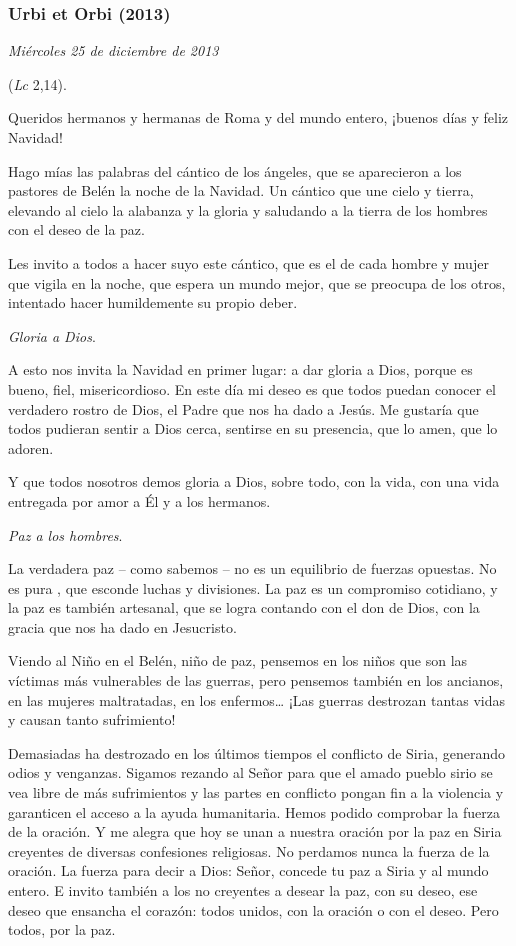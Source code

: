 \subsubsection{Urbi et Orbi (2013)} \emph{Miércoles 25 de diciembre de 2013}


\emph{} (\emph{Lc} 2,14).

Queridos hermanos y hermanas de Roma y del mundo entero, ¡buenos días y feliz Navidad!

Hago mías las palabras del cántico de los ángeles, que se aparecieron a los pastores de Belén la noche de la Navidad. Un cántico que une cielo y tierra, elevando al cielo la alabanza y la gloria y saludando a la tierra de los hombres con el deseo de la paz.

Les invito a todos a hacer suyo este cántico, que es el de cada hombre y mujer que vigila en la noche, que espera un mundo mejor, que se preocupa de los otros, intentado hacer humildemente su propio deber.

\emph{Gloria a Dios}.

A esto nos invita la Navidad en primer lugar: a dar gloria a Dios, porque es bueno, fiel, misericordioso. En este día mi deseo es que todos puedan conocer el verdadero rostro de Dios, el Padre que nos ha dado a Jesús. Me gustaría que todos pudieran sentir a Dios cerca, sentirse en su presencia, que lo amen, que lo adoren.

Y que todos nosotros demos gloria a Dios, sobre todo, con la vida, con una vida entregada por amor a Él y a los hermanos.

\emph{Paz a los hombres}.

La verdadera paz -- como sabemos -- no es un equilibrio de fuerzas opuestas. No es pura , que esconde luchas y divisiones. La paz es un compromiso cotidiano, y la paz es también artesanal, que se logra contando con el don de Dios, con la gracia que nos ha dado en Jesucristo.

Viendo al Niño en el Belén, niño de paz, pensemos en los niños que son las víctimas más vulnerables de las guerras, pero pensemos también en los ancianos, en las mujeres maltratadas, en los enfermos\ldots{} ¡Las guerras destrozan tantas vidas y causan tanto sufrimiento!

Demasiadas ha destrozado en los últimos tiempos el conflicto de Siria, generando odios y venganzas. Sigamos rezando al Señor para que el amado pueblo sirio se vea libre de más sufrimientos y las partes en conflicto pongan fin a la violencia y garanticen el acceso a la ayuda humanitaria. Hemos podido comprobar la fuerza de la oración. Y me alegra que hoy se unan a nuestra oración por la paz en Siria creyentes de diversas confesiones religiosas. No perdamos nunca la fuerza de la oración. La fuerza para decir a Dios: Señor, concede tu paz a Siria y al mundo entero. E invito también a los no creyentes a desear la paz, con su deseo, ese deseo que ensancha el corazón: todos unidos, con la oración o con el deseo. Pero todos, por la paz.

